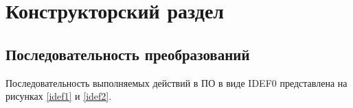 \section{Конструкторский раздел}

\subsection{Последовательность преобразований}

Последовательность выполняемых действий в ПО в виде IDEF0 представлена на рисунках \ref{idef1} и \ref{idef2}.

\begin{figure}[H]
\end{figure}

\begin{figure}[H]
\end{figure}

